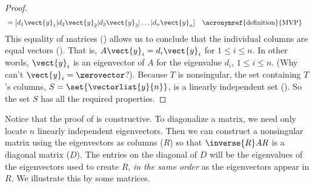 \begin{proof}
\begin{align*}
%
&=[d_1\vect{y}_1|d_2\vect{y}_2|d_3\vect{y}_3|\ldots|d_n\vect{y}_n]
&&\text{\acronymref{definition}{MVP}}
%
\end{align*}
%
This equality of matrices () allows us to conclude that the individual columns are equal vectors ().  That is, $A\vect{y}_i=d_i\vect{y}_i$ for $1\leq i\leq n$.  In other words, $\vect{y}_i$ is an eigenvector of $A$ for the eigenvalue $d_i$, $1\leq i\leq n$.  (Why can't $\vect{y}_i=\zerovector$?).  Because $T$ is nonsingular, the set containing $T$'s columns, $S=\set{\vectorlist{y}{n}}$, is a linearly independent set ().  So the set $S$ has all the required properties.
\end{proof}
%
Notice that the proof of  is constructive.  To diagonalize a matrix, we need only locate $n$ linearly independent eigenvectors.  Then we can construct a nonsingular matrix using the eigenvectors as columns ($R$) so that $\inverse{R}AR$ is a diagonal matrix ($D$).  The entries on the diagonal of $D$ will be the eigenvalues of the eigenvectors used to create $R$, {\em in the same order} as the eigenvectors appear in $R$.  We illustrate this by  some matrices.
%
